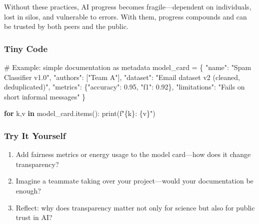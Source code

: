 \documentclass[
  letterpaper,
  DIV=11,
  numbers=noendperiod]{scrreprt}
\newenvironment{Shaded}{\begin{snugshade}}{\end{snugshade}}
\newcommand{\BuiltInTok}[1]{\textcolor[rgb]{0.00,0.23,0.31}{#1}}
\newcommand{\CommentTok}[1]{\textcolor[rgb]{0.37,0.37,0.37}{#1}}
\newcommand{\ControlFlowTok}[1]{\textcolor[rgb]{0.00,0.23,0.31}{\textbf{#1}}}
\newcommand{\FloatTok}[1]{\textcolor[rgb]{0.68,0.00,0.00}{#1}}
\newcommand{\KeywordTok}[1]{\textcolor[rgb]{0.00,0.23,0.31}{\textbf{#1}}}
\newcommand{\NormalTok}[1]{\textcolor[rgb]{0.00,0.23,0.31}{#1}}
\newcommand{\OperatorTok}[1]{\textcolor[rgb]{0.37,0.37,0.37}{#1}}
\newcommand{\SpecialCharTok}[1]{\textcolor[rgb]{0.37,0.37,0.37}{#1}}
\newcommand{\SpecialStringTok}[1]{\textcolor[rgb]{0.13,0.47,0.30}{#1}}
\newcommand{\StringTok}[1]{\textcolor[rgb]{0.13,0.47,0.30}{#1}}
\providecommand{\tightlist}{%
  \setlength{\itemsep}{0pt}\setlength{\parskip}{0pt}}
\begin{document}
Without these practices, AI progress becomes fragile---dependent on
individuals, lost in silos, and vulnerable to errors. With them,
progress compounds and can be trusted by both peers and the public.

\subsubsection{Tiny Code}\label{tiny-code-93}

\begin{Shaded}
\begin{Highlighting}[]
\CommentTok{\# Example: simple documentation as metadata}
\NormalTok{model\_card }\OperatorTok{=}\NormalTok{ \{}
    \StringTok{"name"}\NormalTok{: }\StringTok{"Spam Classifier v1.0"}\NormalTok{,}
    \StringTok{"authors"}\NormalTok{: [}\StringTok{"Team A"}\NormalTok{],}
    \StringTok{"dataset"}\NormalTok{: }\StringTok{"Email dataset v2 (cleaned, deduplicated)"}\NormalTok{,}
    \StringTok{"metrics"}\NormalTok{: \{}\StringTok{"accuracy"}\NormalTok{: }\FloatTok{0.95}\NormalTok{, }\StringTok{"f1"}\NormalTok{: }\FloatTok{0.92}\NormalTok{\},}
    \StringTok{"limitations"}\NormalTok{: }\StringTok{"Fails on short informal messages"}
\NormalTok{\}}

\ControlFlowTok{for}\NormalTok{ k,v }\KeywordTok{in}\NormalTok{ model\_card.items():}
    \BuiltInTok{print}\NormalTok{(}\SpecialStringTok{f"}\SpecialCharTok{\{}\NormalTok{k}\SpecialCharTok{\}}\SpecialStringTok{: }\SpecialCharTok{\{}\NormalTok{v}\SpecialCharTok{\}}\SpecialStringTok{"}\NormalTok{)}
\end{Highlighting}
\end{Shaded}

\subsubsection{Try It Yourself}\label{try-it-yourself-93}

\begin{enumerate}
\def\labelenumi{\arabic{enumi}.}
\tightlist
\item
  Add fairness metrics or energy usage to the model card---how does it
  change transparency?
\item
  Imagine a teammate taking over your project---would your documentation
  be enough?
\item
  Reflect: why does transparency matter not only for science but also
  for public trust in AI?
\end{enumerate}
\end{document}
